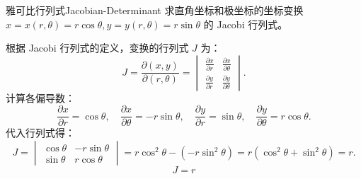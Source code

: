 \begin{problem}{雅可比行列式}{Jacobian-Determinant}
    求直角坐标和极坐标的坐标变换 $x = x(r, \theta) = r \cos \theta, y = y(r, \theta) = r \sin \theta$ 的 Jacobi 行列式。
\end{problem}

\begin{solution}
    根据 Jacobi 行列式的定义，变换的行列式 $J$ 为：
    \begin{equation}
        J = \frac{\partial(x, y)}{\partial(r, \theta)} = \begin{vmatrix}
            \frac{\partial x}{\partial r} & \frac{\partial x}{\partial \theta} \\
            \frac{\partial y}{\partial r} & \frac{\partial y}{\partial \theta}
        \end{vmatrix}.
    \end{equation}
    计算各偏导数：
    \begin{equation}
        \frac{\partial x}{\partial r} = \cos \theta, \quad \frac{\partial x}{\partial \theta} = -r \sin \theta, \quad \frac{\partial y}{\partial r} = \sin \theta, \quad \frac{\partial y}{\partial \theta} = r \cos \theta.
    \end{equation}
    代入行列式得：
    \begin{equation}
        J = \begin{vmatrix}
            \cos \theta & -r \sin \theta \\
            \sin \theta & r \cos \theta
        \end{vmatrix} = r \cos^2 \theta - (-r \sin^2 \theta) = r(\cos^2 \theta + \sin^2 \theta) = r.
    \end{equation}
    \begin{equation}
        \boxed{J = r}
    \end{equation}
\end{solution}

\endinput
